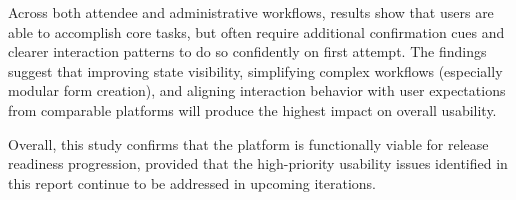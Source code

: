 \documentclass[12pt]{article}
\begin{document}
Across both attendee and administrative workflows, results show that users are able to accomplish core tasks, but often require additional confirmation cues and clearer interaction patterns to do so confidently on first attempt. The findings suggest that improving state visibility, simplifying complex workflows (especially modular form creation), and aligning interaction behavior with user expectations from comparable platforms will produce the highest impact on overall usability.

Overall, this study confirms that the platform is functionally viable for release readiness progression, provided that the high-priority usability issues identified in this report continue to be addressed in upcoming iterations.
\end{document}
